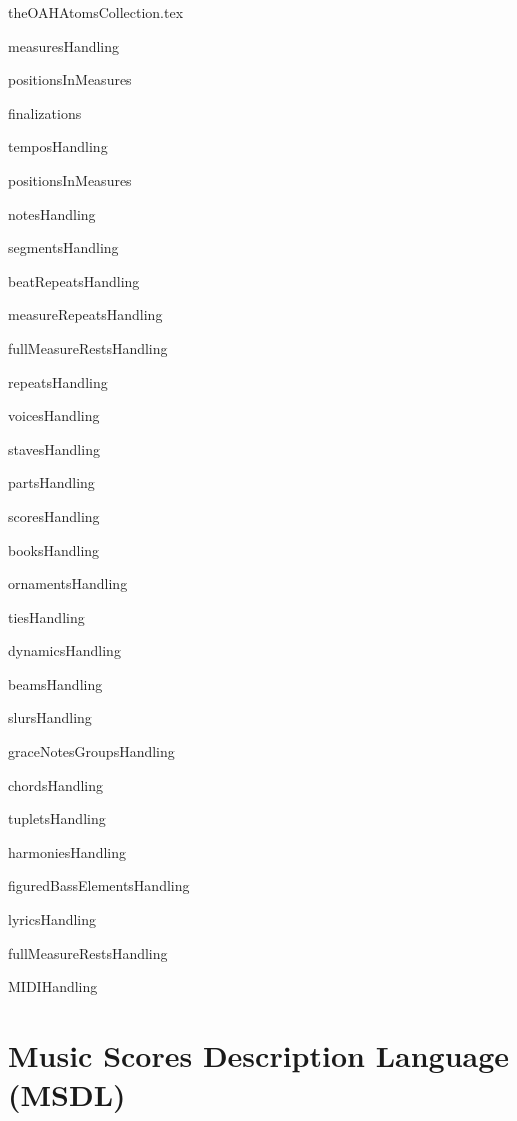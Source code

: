 \documentclass[11pt,a4paper]{report}
\begin{document}
{theOAHAtomsCollection.tex}



{measuresHandling}

{positionsInMeasures}

{finalizations}

{temposHandling}

{positionsInMeasures}

{notesHandling}

{segmentsHandling}

{beatRepeatsHandling}

{measureRepeatsHandling}

{fullMeasureRestsHandling}

{repeatsHandling}

{voicesHandling}

{stavesHandling}

{partsHandling}

{scoresHandling}

{booksHandling}

{ornamentsHandling}

{tiesHandling}

{dynamicsHandling}

{beamsHandling}

{slursHandling}

{graceNotesGroupsHandling}

{chordsHandling}

{tupletsHandling}

{harmoniesHandling}

{figuredBassElementsHandling}

{lyricsHandling}

{fullMeasureRestsHandling}

{MIDIHandling}


\part{Music Scores Description Language (MSDL)}
\end{document}
